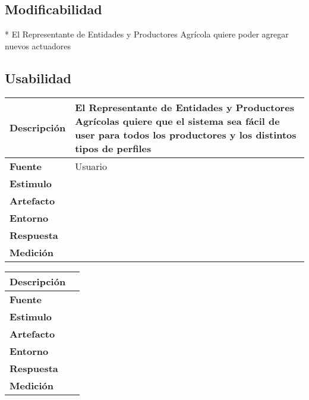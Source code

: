 \subsection{Modificabilidad}

* El Representante de Entidades y Productores Agr\'icola quiere poder agregar nuevos actuadores
\subsection{Usabilidad}
\begin{tabular}{| l || p{12cm} |}
\hline 
\textbf{Descripci\'on} & El Representante de Entidades y Productores Agr\'icolas quiere que el sistema sea f\'acil de user para todos los productores y los distintos tipos de perfiles\\
\hline 
\textbf{Fuente} & Usuario \\
\hline 
\textbf{Estimulo} & \\
\hline 
\textbf{Artefacto} & \\
\hline 
\textbf{Entorno} & \\
\hline 
\textbf{Respuesta} & \\
\hline 
\textbf{Medici\'on} & \\
\hline 
\end{tabular}

\begin{tabular}{| l || p{12cm} |}
\hline 
\textbf{Descripci\'on} & \\
\hline 
\textbf{Fuente} & \\
\hline 
\textbf{Estimulo} & \\
\hline 
\textbf{Artefacto} & \\
\hline 
\textbf{Entorno} & \\
\hline 
\textbf{Respuesta} & \\
\hline 
\textbf{Medici\'on} & \\
\hline 
\end{tabular}